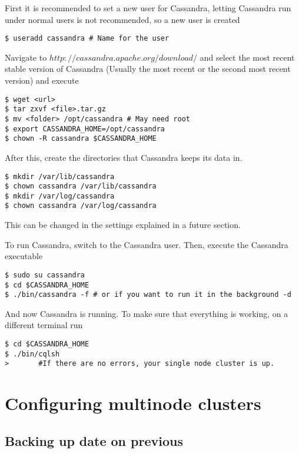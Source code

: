 \documentclass[9pt,twocolumn,twoside]{idsi}
\begin{document}
First it is recommended to set a new user for Cassandra, letting Cassandra run under normal users is not recommended, so a new user is created

\begin{lstlisting}[breaklines]
$ useradd cassandra # Name for the user
\end{lstlisting}

Navigate to $http://cassandra.apache.org/download/$ and select the most recent stable version of Cassandra (Usually the most recent or the second most recent version) and execute

\begin{lstlisting}[breaklines]
$ wget <url>
$ tar zxvf <file>.tar.gz
$ mv <folder> /opt/cassandra # May need root
$ export CASSANDRA_HOME=/opt/cassandra
$ chown -R cassandra $CASSANDRA_HOME
\end{lstlisting}

After this, create the directories that Cassandra keeps its data in.

\begin{lstlisting}[breaklines]
$ mkdir /var/lib/cassandra
$ chown cassandra /var/lib/cassandra
$ mkdir /var/log/cassandra
$ chown cassandra /var/log/cassandra
\end{lstlisting}

This can be changed in the settings explained in a future section.

To run Cassandra, switch to the Cassandra user. Then, execute the Cassandra executable

\begin{lstlisting}[breaklines]
$ sudo su cassandra
$ cd $CASSANDRA_HOME
$ ./bin/cassandra -f # or if you want to run it in the background -d
\end{lstlisting}

And now Cassandra is running. To make sure that everything is working, on a different terminal run

\begin{lstlisting}[breaklines]
$ cd $CASSANDRA_HOME
$ ./bin/cqlsh
>       #If there are no errors, your single node cluster is up.
\end{lstlisting}

\section{Configuring multinode clusters}

\subsection{Backing up date on previous}
\end{document}
